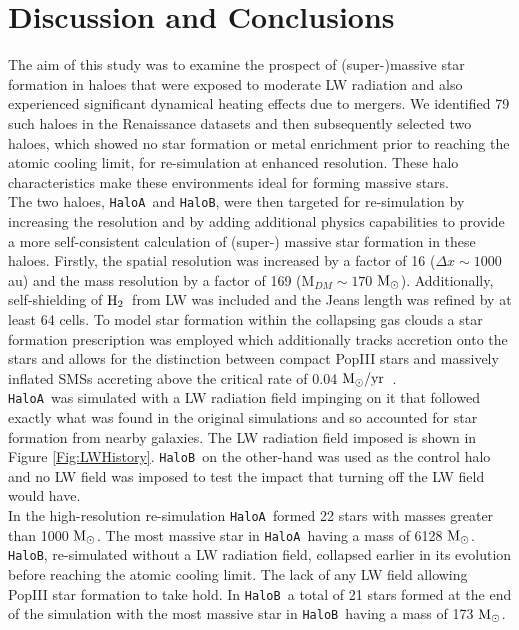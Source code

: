 \documentclass[graphics, twocolumn, usenatbib]{mn2e}
\newcommand{\msolarc} {$\rm{M_{\odot}}$}
\newcommand{\msolaryrc} {$\rm{M_{\odot}/yr}$}
\newcommand{\molH} {$\rm{H_2}$~}
\newcommand{\ha} {\texttt{HaloA~}}
\newcommand{\hb} {\texttt{HaloB~}}
\newcommand{\hbc} {\texttt{HaloB}}
\begin{document}
\section{Discussion and Conclusions} \label{Sec:Discussion}
The aim of this study was to examine the prospect of (super-)massive star formation in haloes
that were exposed to moderate LW radiation and also experienced significant dynamical heating
effects due to mergers. We identified 79 such haloes in the Renaissance 
datasets \citep{Regan_2020} and then subsequently selected two haloes, which showed no star formation or metal enrichment prior to reaching the
atomic cooling limit, for re-simulation at enhanced resolution. These halo characteristics make these environments ideal for forming massive
stars. \\
\indent The two haloes, \ha and \hbc, were then targeted for re-simulation by 
increasing the resolution and by adding additional physics capabilities to provide a more self-consistent calculation of (super-) massive star formation in these haloes. Firstly, the spatial resolution was increased by a factor of 16 ($\Delta x \sim 1000$ au) and the mass resolution by a factor of
169 (M$_{DM} \sim 170$ \msolarc). Additionally, self-shielding of \molH from LW was included and the Jeans length was refined by at least 64 cells.  To model star formation within the collapsing gas clouds a star formation prescription was employed which additionally tracks accretion
onto the stars and allows for the distinction between compact PopIII stars and massively inflated
SMSs accreting above the critical rate of 0.04 \msolaryrc \ \citep{Sakurai_2016}.\\
\indent \ha was simulated with a LW radiation field impinging on it that followed exactly what was
found in the original simulations and so accounted for star formation from nearby galaxies. The
LW radiation field imposed is shown in Figure \ref{Fig:LWHistory}. \hb on the other-hand was used as the
control halo and no LW field was imposed to test the impact that turning off the LW field would have.\\
\indent In the high-resolution re-simulation \ha formed 22 stars with masses greater than 1000
\msolarc. The most massive star in \ha having a mass of 6128 \msolarc. \hbc, re-simulated without
a LW radiation field, collapsed earlier in its evolution before reaching the atomic cooling limit.
The lack of any LW field allowing PopIII star formation to take hold. In \hb a total of 21 stars
formed at the end of the simulation with the most massive star in \hb having a mass of 173 \msolarc.
\end{document}
